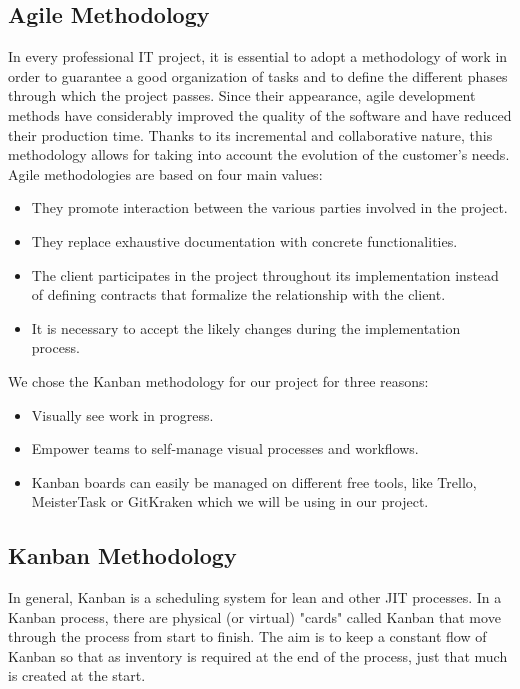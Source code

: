 \begin{spacing}{1.2}
\subsection{Agile Methodology}
In every professional IT project, it is essential to adopt a methodology
of work in order to guarantee a good organization of tasks and to define the different phases
through which the project passes.
Since their appearance, agile \cite{agile}  development methods have considerably improved
the quality of the software and have reduced their production time. Thanks to its incremental and collaborative nature, this methodology allows for taking into account the evolution
of the customer's needs. Agile methodologies are based on four main values:
\begin{itemize}
	\item They promote interaction between the various parties involved in the project.
\item They replace exhaustive documentation with concrete functionalities.
\item The client participates in the project throughout its implementation instead of defining contracts
that formalize the relationship with the client.
\item It is necessary to accept the likely changes during the implementation process.
\end{itemize}

We chose the Kanban methodology for our project for three reasons:

\begin{itemize}
	\item Visually see work in progress.
	\item Empower teams to self-manage visual processes and workflows.
	\item Kanban boards can easily be managed on different free tools, like Trello, MeisterTask or GitKraken which we will be using in our project.
\end{itemize}



\subsection{Kanban Methodology}

In general, Kanban \cite{kanban} is a scheduling system for lean and other JIT processes. In a Kanban process, there are physical (or virtual) "cards" called Kanban that move through the process from start to finish. The aim is to keep a constant flow of Kanban so that as inventory is required at the end of the process, just that much is created at the start.
\newline


\end{spacing}
